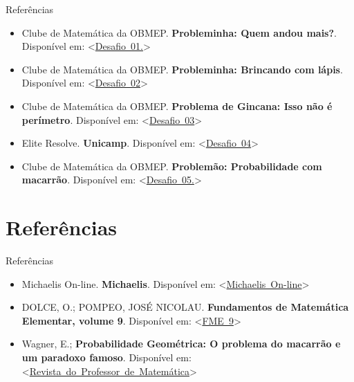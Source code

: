 \documentclass[12pt]{beamer}
\begin{document}
\begin{frame}{Referências}
	\justifying
	\begin{itemize}
		\item Clube de Matemática da OBMEP. \textbf{Probleminha: Quem andou mais?}. Disponível em: <\href{https://clubes.obmep.org.br/blog/problema-quem-andou-mais/}{Desafio\  01.}>
		
		\item Clube de Matemática da OBMEP. \textbf{Probleminha: Brincando com lápis}. Disponível em: <\href{https://clubes.obmep.org.br/blog/probleminha-brincando-com-lapis/}{Desafio\  02}>
		
		\item Clube de Matemática da OBMEP. \textbf{Problema de Gincana: Isso não é perímetro}. Disponível em: <\href{https://clubes.obmep.org.br/blog/problema-de-gincana-isso-nao-e-perimetro/}{Desafio\  03}>
		
		\item Elite Resolve. \textbf{Unicamp}. Disponível em: <\href{https://sisq.elitecampinas.com.br/GabaritoVestibulares/VisualizarQuestao?id_questao_tipo=10200}{Desafio\ 04}>
		
		\item Clube de Matemática da OBMEP. \textbf{Problemão: Probabilidade com macarrão}. Disponível em: <\href{https://clubes.obmep.org.br/blog/problemao-probabilidade-com-macarrao/}{Desafio\  05.}>
	\end{itemize}
\end{frame}

\section{Referências}

\begin{frame}{Referências}
	\justifying
	\begin{itemize}
		\item Michaelis On-line. \textbf{Michaelis}. Disponível em: <\href{https://michaelis.uol.com.br/}{Michaelis\ On-line}>
		
		\item DOLCE, O.; POMPEO, JOSÉ NICOLAU. \textbf{Fundamentos de Matemática Elementar, volume 9}. Disponível em: <\href{https://barbosadejesu.wordpress.com/wp-content/uploads/2021/09/fundamentos-da-matematica-elementar-9.pdf}{FME\  9}>
		
		\item Wagner, E.; \textbf{Probabilidade Geométrica: O problema do macarrão e um paradoxo famoso}. Disponível em: <\href{https://rpm.org.br/cdrpm/34/6.htm}{Revista\ do\ Professor\ de\ Matem\'atica}>
		
		
	
	\end{itemize}
\end{frame}
\end{document}
